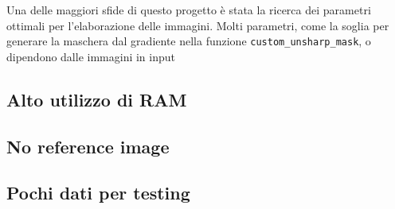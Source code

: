 Una delle maggiori sfide di questo progetto è stata la ricerca dei parametri ottimali per l'elaborazione delle immagini. Molti parametri, come la soglia per generare la maschera dal gradiente nella funzione \texttt{custom\_unsharp\_mask}, o  dipendono dalle immagini in input

\subsection{Alto utilizzo di RAM}

\subsection{No reference image}

\subsection{Pochi dati per testing}


\cleardoublepage

\cleardoublepage
